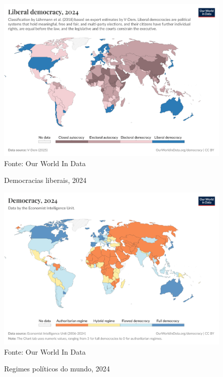 \begin{figure}[ht]
    \centering
    \caption{Democracias liberais, 2024}
    \includegraphics[width=1\linewidth]{figuras/democracia/liberal-democracy-row.png}
    \label{fig:liberal-democracy-row}
    \footnotesize{Fonte: Our World In Data}
\end{figure}

\begin{figure}[ht]
    \centering
    \caption{Regimes políticos do mundo, 2024}
    \includegraphics[width=1\linewidth]{figuras/democracia/political-regime-eiu.png}
    \label{fig:political-regime-eiu}
    \footnotesize{Fonte: Our World In Data}
\end{figure}

